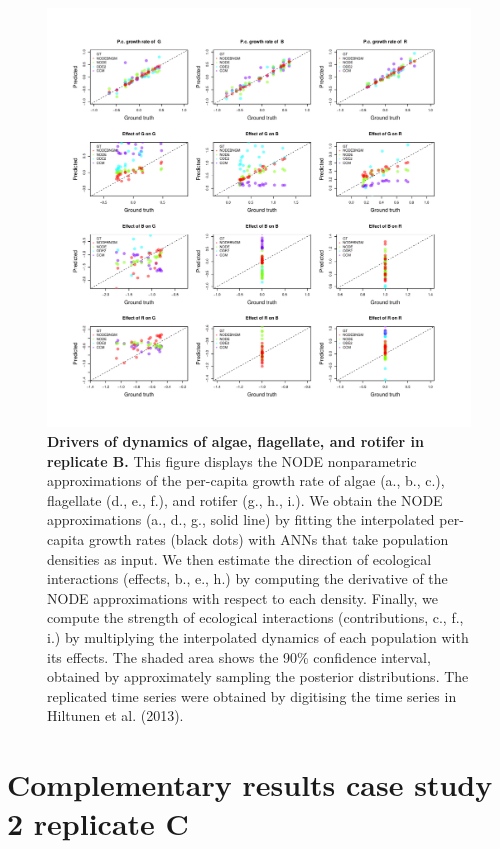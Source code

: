 \documentclass[11pt, oneside]{article}
\begin{document}
\newpage
\begin{figure}[H]
\includegraphics[width=1\linewidth,page=11]{figures/figures_supplementary.pdf}
\caption{
    \textbf{Drivers of dynamics of algae, flagellate, and rotifer in replicate B.}
    This figure displays the NODE nonparametric approximations of the per-capita growth rate of algae (a., b., c.), flagellate (d., e., f.), and rotifer (g., h., i.).
    We obtain the NODE approximations (a., d., g., solid line) by fitting the interpolated per-capita growth rates (black dots) with ANNs that take population densities as input.
    We then estimate the direction of ecological interactions (effects, b., e., h.) by computing the derivative of the NODE approximations with respect to each density.
    Finally, we compute the strength of ecological interactions (contributions, c., f., i.) by multiplying the interpolated dynamics of each population with its effects.
    The shaded area shows the 90\% confidence interval, obtained by approximately sampling the posterior distributions. 
    The replicated time series were obtained by digitising the time series in Hiltunen et al. (2013).
}
\end{figure}
\newpage

\newpage
\section{Complementary results case study 2 replicate C}
\end{document}
